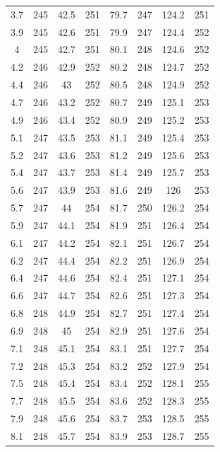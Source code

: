 \documentclass[12pt]{ctexart}
\numberwithin{equation}{section}
\begin{document}
\begin{longtable}{cc|cc|cc|cc}
3.7  &  245  &  42.5  &  251  &  79.7  &  247  &  124.2  &  251  \\
3.9  &  245  &  42.6  &  251  &  79.9  &  247  &  124.4  &  252  \\
4  &  245  &  42.7  &  251  &  80.1  &  248  &  124.6  &  252  \\
4.2  &  246  &  42.9  &  252  &  80.2  &  248  &  124.7  &  252  \\
4.4  &  246  &  43  &  252  &  80.5  &  248  &  124.9  &  252  \\
4.7  &  246  &  43.2  &  252  &  80.7  &  249  &  125.1  &  253  \\
4.9  &  246  &  43.4  &  252  &  80.9  &  249  &  125.2  &  253  \\
5.1  &  247  &  43.5  &  253  &  81.1  &  249  &  125.4  &  253  \\
5.2  &  247  &  43.6  &  253  &  81.2  &  249  &  125.6  &  253  \\
5.4  &  247  &  43.7  &  253  &  81.4  &  249  &  125.7  &  253  \\
5.6  &  247  &  43.9  &  253  &  81.6  &  249  &  126  &  253  \\
5.7  &  247  &  44  &  254  &  81.7  &  250  &  126.2  &  254  \\
5.9  &  247  &  44.1  &  254  &  81.9  &  251  &  126.4  &  254  \\
6.1  &  247  &  44.2  &  254  &  82.1  &  251  &  126.7  &  254  \\
6.2  &  247  &  44.4  &  254  &  82.2  &  251  &  126.9  &  254  \\
6.4  &  247  &  44.6  &  254  &  82.4  &  251  &  127.1  &  254  \\
6.6  &  247  &  44.7  &  254  &  82.6  &  251  &  127.3  &  254  \\
6.8  &  248  &  44.9  &  254  &  82.7  &  251  &  127.4  &  254  \\
6.9  &  248  &  45  &  254  &  82.9  &  251  &  127.6  &  254  \\
7.1  &  248  &  45.1  &  254  &  83.1  &  251  &  127.7  &  254  \\
7.2  &  248  &  45.3  &  254  &  83.2  &  252  &  127.9  &  254  \\
7.5  &  248  &  45.4  &  254  &  83.4  &  252  &  128.1  &  255  \\
7.7  &  248  &  45.5  &  254  &  83.6  &  252  &  128.3  &  255  \\
7.9  &  248  &  45.6  &  254  &  83.7  &  253  &  128.5  &  255  \\
8.1  &  248  &  45.7  &  254  &  83.9  &  253  &  128.7  &  255  \\

\end{longtable}
\end{document}
